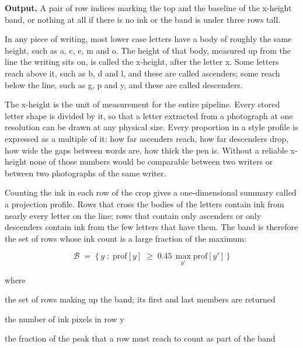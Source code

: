 \noindent\textbf{Output.} A pair of row indices marking the top and the baseline of the x-height band, or nothing at all if there is no ink or the band is under three rows tall.


In any piece of writing, most lower case letters have a body of roughly the same height, such as a, c, e, m and o. The height of that body, measured up from the line the writing sits on, is called the x-height, after the letter x. Some letters reach above it, such as b, d and l, and these are called ascenders; some reach below the line, such as g, p and y, and these are called descenders.


The x-height is the unit of measurement for the entire pipeline. Every stored letter shape is divided by it, so that a letter extracted from a photograph at one resolution can be drawn at any physical size. Every proportion in a style profile is expressed as a multiple of it: how far ascenders reach, how far descenders drop, how wide the gaps between words are, how thick the pen is. Without a reliable x-height none of those numbers would be comparable between two writers or between two photographs of the same writer.


Counting the ink in each row of the crop gives a one-dimensional summary called a projection profile. Rows that cross the bodies of the letters contain ink from nearly every letter on the line; rows that contain only ascenders or only descenders contain ink from the few letters that have them. The band is therefore the set of rows whose ink count is a large fraction of the maximum:


\begin{equation}
\mathcal{B} \;=\; \Big\{\, y \;:\; \mathrm{prof}[y] \;\ge\; 0.45\,\max_{y'} \mathrm{prof}[y'] \,\Big\}
\end{equation}

\noindent where
\begin{description}[leftmargin=2.4em,style=nextline,font=\normalfont\ttfamily]\setlength\itemsep{1pt}
  \item[{$\mathcal{B}$}] \normalfont the set of rows making up the band; its first and last members are returned
  \item[{$\mathrm{prof}[y]$}] \normalfont the number of ink pixels in row y
  \item[{$0.45$}] \normalfont the fraction of the peak that a row must reach to count as part of the band
\end{description}

